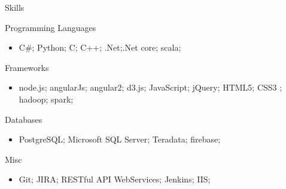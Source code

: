 \documentclass[]{nakulcv}
\begin{document}
\makeheader

\begin{cvsection}{Skills}
	\begin{cvsubsection}{Programming Languages}{}{}	
		\begin{itemize}
			\item C\#; Python; C; C++; .Net;.Net core; scala;
		\end{itemize}
	\end{cvsubsection}
	\begin{cvsubsection}{Frameworks}{}{}
		\begin{itemize}
			\item node.js; angularJs; angular2; d3.js; JavaScript; jQuery; HTML5; CSS3 ; hadoop; spark;
		\end{itemize}
	\end{cvsubsection}
	\begin{cvsubsection}{Databases}{}{}
		\begin{itemize}
			\item PostgreSQL; Microsoft SQL Server; Teradata; firebase;
		\end{itemize}
	\end{cvsubsection}
	\begin{cvsubsection}{Misc}{}{}
		\begin{itemize}
			\item Git; JIRA; RESTful API WebServices; Jenkins; IIS;
		\end{itemize}
	\end{cvsubsection}
\end{cvsection}
\end{document}
